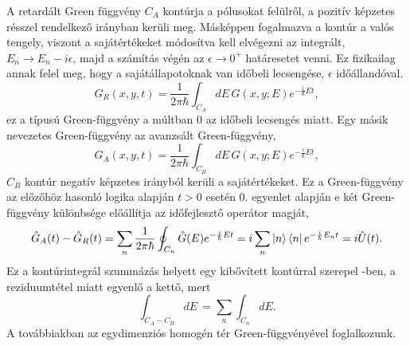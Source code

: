 A retardált Green függvény $C_A$ kontúrja a pólusokat felülről, a pozitív képzetes résszel rendelkező irányban kerüli meg. Másképpen fogalmazva a kontúr a valós tengely, viszont a sajátértékeket módosítva kell elvégezni az integrált, $E_n\to E_n-i\epsilon$, majd a számítás végén az $\epsilon\to 0^+$ határesetet venni. Ez fizikailag annak felel meg, hogy a sajátállapotoknak van időbeli lecsengése, $\epsilon$ időállandóval.
\begin{equation}
	G_R(x,y,t)=\frac{1}{2\pi\hbar}\int_{C_A}dE\,G(x,y;E)e^{-\frac{i}{\hbar}Et},
\end{equation}
ez a típusú Green-függvény a múltban $0$ az időbeli lecsengés miatt. Egy másik nevezetes Green-függvény az avanzsált Green-függvény,
\begin{equation}
	G_A(x,y,t)=\frac{1}{2\pi\hbar}\int_{C_B}dE\,G(x,y;E)e^{-\frac{i}{\hbar}Et},
\end{equation}
$C_B$ kontúr negatív képzetes irányból kerüli a sajátértékeket. Ez a Green-függvény az előzőhöz hasonló logika alapján $t>0$ esetén $0$.  egyenlet alapján e két Green-függvény különbsége előállítja az időfejlesztő operátor magját,
\begin{equation}
	\hat{G}_A(t)-\hat{G}_R(t)=\sum_n\frac{1}{2\pi\hbar}\oint_{C_n}\hat{G}(E)e^{-\frac{i}{\hbar}Et}=i\sum_n\Ket{n}\Bra{n}e^{-\frac{i}{\hbar}E_nt}=i\hat{U}(t).
\end{equation}
Ez a kontúrintegrál szummázás helyett egy kibővített kontúrral szerepel \cite{pertergreen}-ben, a reziduumtétel miatt egyenlő a kettő, mert
\begin{equation}
	\int_{C_A-C_B}dE\,=\sum_n\int_{C_n}dE.
\end{equation}
 A továbbiakban az egydimenziós homogén tér Green-függvényével foglalkozunk.







